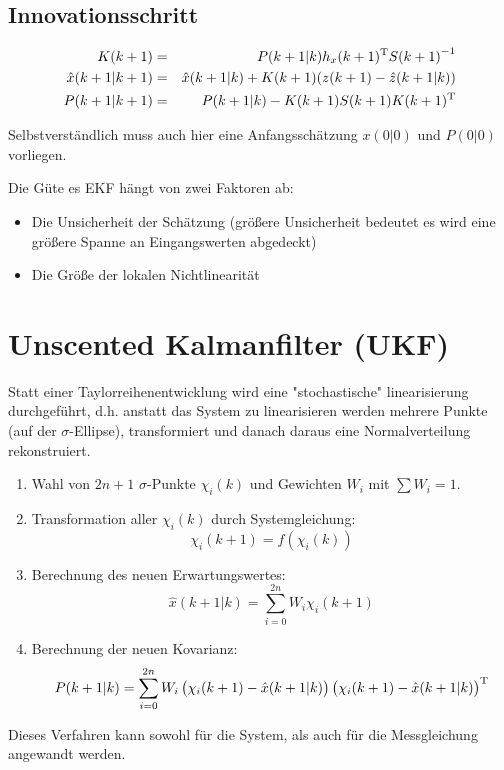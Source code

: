\subsection{Innovationsschritt}
\begin{eqnarray*}
    K(k+1) &=& P(k+1|k) h_x(k+1)^\text{T} {S(k+1)}^{-1} \\
    \hat{x}(k+1|k+1) &=& \hat{x}(k+1|k) + K(k+1) (z(k+1) - \hat{z}(k+1|k)) \\
    P(k+1|k+1) &=& P(k+1|k) - K(k+1)S(k+1)K(k+1)^\text{T}
\end{eqnarray*}

Selbstverständlich muss auch hier eine Anfangsschätzung $x(0|0)$ und $P(0|0)$ vorliegen.

Die Güte es EKF hängt von zwei Faktoren ab:
\begin{itemize}
    \item Die Unsicherheit der Schätzung (größere Unsicherheit bedeutet es wird eine größere Spanne an Eingangswerten
        abgedeckt)
    \item Die Größe der lokalen Nichtlinearität
\end{itemize}

\section{Unscented Kalmanfilter (UKF)}
Statt einer Taylorreihenentwicklung wird eine "stochastische" linearisierung durchgeführt, d.h. anstatt das System
zu linearisieren werden mehrere Punkte (auf der $\sigma$-Ellipse), transformiert und danach daraus eine 
Normalverteilung rekonstruiert.

\begin{enumerate}
    \item Wahl von $2n+1$ $\sigma$-Punkte $\chi_i(k)$ und Gewichten $W_i$ mit $\sum W_i = 1$.
    \item Transformation aller $\chi_i(k)$ durch Systemgleichung:
        \begin{equation*}
            \chi_i(k+1) = f(\chi_i(k))
        \end{equation*}
    \item Berechnung des neuen Erwartungswertes:
        \begin{equation*}
            \hat{x}(k+1|k) = \sum_{i=0}^{2n} W_i \chi_i(k+1)
        \end{equation*}
    \item Berechnung der neuen Kovarianz:
        \begin{equation*}
            P(k+1|k) = \sum_{i=0}^{2n} W_i \left(\chi_i(k+1) - \hat{x}(k+1|k) \right) 
                \left(\chi_i(k+1) - \hat{x}(k+1|k) \right)^\text{T}
        \end{equation*}
\end{enumerate}
Dieses Verfahren kann sowohl für die System, als auch für die Messgleichung angewandt werden.

